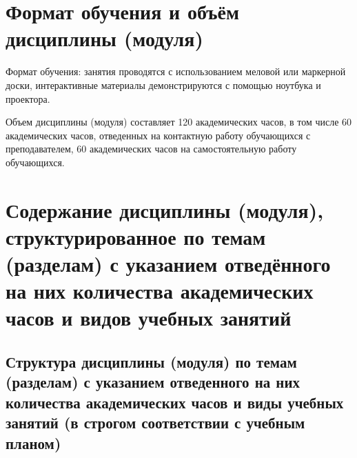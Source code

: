 \documentclass[a4paper, 12pt]{article}
\begin{document}
\section{Формат обучения и объём дисциплины (модуля)}

Формат обучения: занятия проводятся с использованием меловой или маркерной доски, интерактивные материалы демонстрируются с помощью ноутбука и проектора.

Объем дисциплины (модуля) составляет 120 академических часов, в том числе 60 академических часов, отведенных на контактную работу обучающихся с преподавателем, 60 академических часов на самостоятельную работу обучающихся.

\section{Содержание дисциплины (модуля), структурированное по темам (разделам) с указанием отведённого на них количества академических часов и видов учебных занятий}

\subsection{Структура дисциплины (модуля) по темам (разделам) с указанием отведенного на них количества академических часов и виды учебных занятий (в строгом соответствии с учебным планом)}
\end{document}
